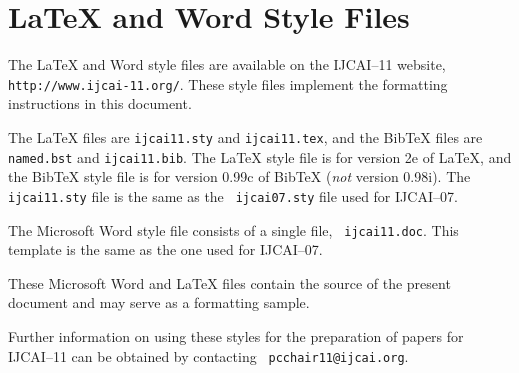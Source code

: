 \documentclass{article}
\begin{document}
\appendix

\section{\LaTeX{} and Word Style Files}\label{stylefiles}

The \LaTeX{} and Word style files are available on the IJCAI--11
website, {\tt http://www.ijcai-11.org/}.
These style files implement the formatting instructions in this
document.

The \LaTeX{} files are {\tt ijcai11.sty} and {\tt ijcai11.tex}, and
the Bib\TeX{} files are {\tt named.bst} and {\tt ijcai11.bib}. The
\LaTeX{} style file is for version 2e of \LaTeX{}, and the Bib\TeX{}
style file is for version 0.99c of Bib\TeX{} ({\em not} version
0.98i). The {\tt ijcai11.sty} file is the same as the {\tt
ijcai07.sty} file used for IJCAI--07.

The Microsoft Word style file consists of a single file, {\tt
ijcai11.doc}. This template is the same as the one used for
IJCAI--07.

These Microsoft Word and \LaTeX{} files contain the source of the
present document and may serve as a formatting sample.  

Further information on using these styles for the preparation of
papers for IJCAI--11 can be obtained by contacting {\tt
pcchair11@ijcai.org}.



\end{document}
